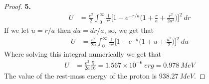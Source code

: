\documentclass[11pt]{article}
\theoremstyle{definition}
\begin{document}
\begin{proof}{\textbf{5.}}
\begin{align*}
    U &= \frac{e^2}{2}\int_0^\infty \frac{1}{r^2}
    \bigg[1 - e^{-r/a}\bigg(1 + \frac{r}{a} + \frac{r^2}{2a^2}\bigg)\bigg]^2
    ~dr
\end{align*}
If we let $u = r/a$ then $du = dr/a$, so, we get that
\begin{align*}
    U &= \frac{e^2}{2a}\int_0^\infty \frac{1}{u^2}
    \bigg[1 - e^{-u}\bigg(1 + u + \frac{u^2}{2}\bigg)\bigg]^2 ~du
\end{align*}
Where solving this integral numerically we get that
\begin{align*}
    U &= \frac{e^2}{2a}\frac{5}{16} = 1.567\times 10^{-6}~erg = 0.978~MeV
\end{align*}
The value of the rest-mass energy of the proton is $938.27~MeV$.
\end{proof}

\cleardoublepage
\end{document}
